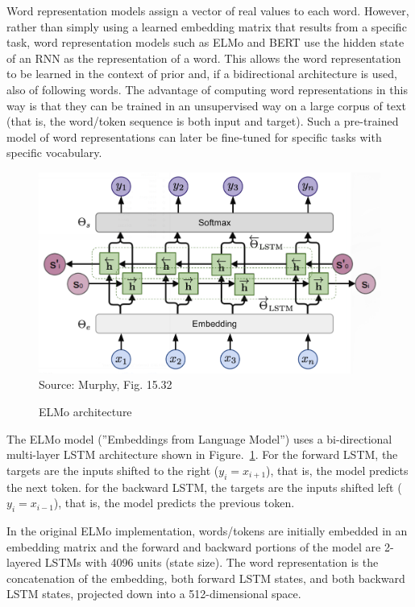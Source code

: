 Word representation models assign a vector of real values to each word. However, rather than simply using a learned embedding matrix that results from a specific task, word representation models such as ELMo and BERT use the hidden state of an RNN as the representation of a word. This allows the word representation to be learned in the context of prior and, if a bidirectional architecture is used, also of following words. The advantage of computing word representations in this way is that they can be trained in an unsupervised way on a large corpus of text (that is, the word/token sequence is both input and target). Such a pre-trained model of word representations can later be fine-tuned for specific tasks with specific vocabulary.


\begin{figure}
\centering
\includegraphics[width=.8\textwidth]{murphy_15_32.png} \\

\scriptsize Source: Murphy, Fig. 15.32 \normalsize
\caption{ELMo architecture}
\label{fig:murphy_15_32}
\end{figure}

The ELMo model (''Embeddings from Language Model'') uses a bi-directional multi-layer LSTM architecture shown in Figure.~\ref{fig:murphy_15_32}. For the forward LSTM, the targets are the inputs shifted to the right ($y_i = x_{i+1}$), that is, the model predicts the next token. for the backward LSTM, the targets are the inputs shifted left ($y_i = x_{i-1}$), that is, the model predicts the previous token. 

In the original ELMo implementation, words/tokens are initially embedded in an embedding matrix and the forward and backward portions of the model are 2-layered LSTMs with 4096 units (state size). The word representation is the concatenation of the embedding, both forward LSTM states, and both backward LSTM states, projected down into a 512-dimensional space. 

